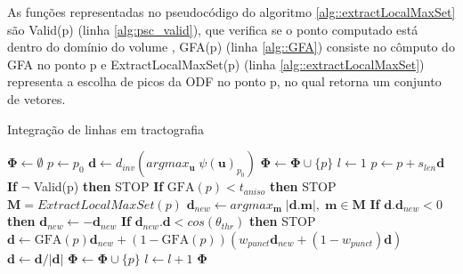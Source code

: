 \documentclass[
    12pt,                %
    oneside,            %
    a4paper,            %
    english,            %
    french,                %
    spanish,            %
    brazil                %
    ]{abntex2}
\begin{document}

As funções representadas no pseudocódigo do algoritmo \ref{alg::extractLocalMaxSet} são Valid(p) (linha \ref{alg:psc_valid}), que verifica se o ponto computado está dentro do domínio do volume , GFA(p) (linha \ref{alg::GFA}) consiste no cômputo do GFA no ponto p e ExtractLocalMaxSet(p) (linha \ref{alg::extractLocalMaxSet}) representa a escolha de picos da ODF no ponto p, no qual retorna um conjunto de vetores.





\begin{algorithm}
\caption{Integração de linhas em tractografia}
\label{psc::tractography}
\begin{algorithmic}[1]
\State $\mathbf{\Phi} \gets \emptyset$
\State $p \gets p_0$
\State $\mathbf{d} \gets d_{inv}(argmax_\mathbf{u} \; \psi(\mathbf{u})_{p_0})$
\State $\mathbf{\Phi} \gets \mathbf{\Phi} \cup  \{p\}$ 
\State $l \gets 1$
\State $p \gets p + s_{len} \mathbf{d}$
\State \textbf{If} $\neg$ Valid(p) \textbf{then} STOP \label{alg:psc_valid} %
\State \textbf{If} $\text{GFA}(p) < t_{aniso}$  \textbf{then} STOP \label{alg::GFA}%
\State $\mathbf{M} = ExtractLocalMaxSet(p)$ \label{alg::extractLocalMaxSet}
\State $\mathbf{d}_{new} \gets argmax_{\textbf{m}} \; |\mathbf{d}.\mathbf{m}|, \; \mathbf{m} \in \mathbf{M}$
\State \textbf{If} $\mathbf{d}.\mathbf{d}_{new} < 0$  \textbf{then} $\mathbf{d}_{new} \gets -\mathbf{d}_{new}$%
\State \textbf{If} $\mathbf{d}_{new}.\mathbf{d} < cos(\theta_{thr})$ \textbf{then} STOP%
\State $\mathbf{d} \gets \text{GFA}(p)\mathbf{d}_{new} + (1 - \text{GFA}(p))(w_{punct}\mathbf{d}_{new} + (1 - w_{punct})\mathbf{d})$
\State $\mathbf{d} \gets \mathbf{d}/|\mathbf{d}|$
\State $\mathbf{\Phi} \gets \mathbf{\Phi} \cup  \{p\}$
\State $l \gets l + 1$
\EndWhile
\State \Return $\mathbf{\Phi}$
\EndFunction
\end{algorithmic}
\end{algorithm}
\end{document}
